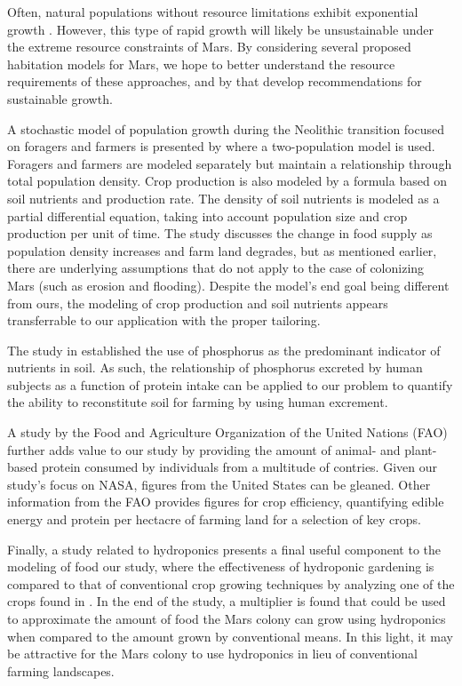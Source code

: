 \documentclass[12pt]{article}
\begin{document}
Often, natural populations without resource limitations exhibit exponential
growth \cite{audesirk1996biology}. However, this type of rapid growth will
likely be unsustainable under the extreme resource constraints of Mars.
By considering several proposed habitation models for Mars, we hope to better
understand the resource requirements of these approaches, and by that develop
recommendations for sustainable growth.

A stochastic model of population growth	during the Neolithic transition focused
on foragers and farmers is presented by \cite{fedotov2008stochastic} where a
two-population model is used. Foragers and farmers are modeled separately but
maintain a relationship through total population density. Crop production is
also modeled by a formula based on soil nutrients and production rate.  The
density of soil nutrients is modeled as a partial differential equation, taking
into account population size and crop production per unit of time.  The study
discusses the change in food supply as population density increases and farm
land degrades, but as mentioned earlier, there are underlying assumptions that
do not apply to the case of colonizing Mars (such as erosion and flooding).
Despite the model's end goal being different from ours, the modeling of crop
production and soil nutrients appears transferrable to our application with
the proper tailoring.

The study in \cite{fedotov2008stochastic} established the use of phosphorus as
the predominant indicator of nutrients in soil.  As such, the relationship of
phosphorus excreted by human subjects as a function of protein intake
\cite{pooOnYOu} can be applied to our problem to quantify
the ability to reconstitute soil for farming by using human excrement.

A study by the Food and Agriculture Organization of the United Nations (FAO)
\cite{faoProtein} further adds value to our study by providing the
amount of animal- and plant-based protein consumed by individuals from a
multitude of contries.  Given our study's focus on NASA, figures from the United
States can be gleaned.  Other information from the FAO \cite{faoNutrition}
provides figures for crop efficiency, quantifying edible energy
and protein per hectacre of farming land for a selection of key crops.

Finally, a study related to hydroponics \cite{iHeartHydroponics} presents a
final useful component to the modeling of food our study, where the effectiveness
of hydroponic gardening is compared to that of conventional crop growing techniques
by analyzing one of the crops found in \cite{faoNutrition}.
In the end of the study, a multiplier is found that could be used to approximate
the amount of food the Mars colony can grow using hydroponics when compared to
the amount grown by conventional means.  In this light,
it may be attractive for the Mars colony to use hydroponics in lieu of
conventional farming landscapes.
\end{document}
